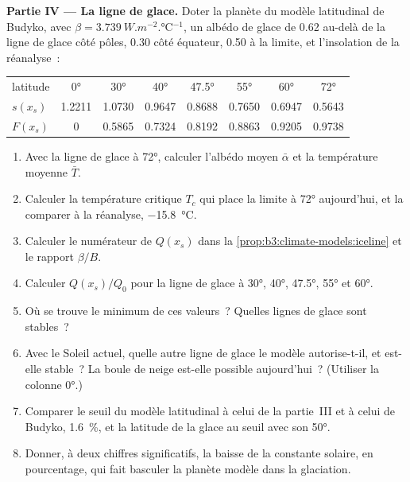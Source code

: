 \begin{problem}
\medskip\noindent\textbf{Partie IV --- La ligne de glace.} Doter la planète
du modèle latitudinal de Budyko, avec $\beta = \qty{3.739}{W.m^{-2}.\celsius^{-1}}$,
un albédo de glace de 0.62 au-delà de la ligne de glace côté pôles, 0.30 côté équateur, 0.50 à
la limite, et l'insolation de la réanalyse~:
\begin{center}
\begin{tabular}{lccccccc}
\hline
latitude & \ang{0} & \ang{30} & \ang{40} & \ang{47.5} & \ang{55} & \ang{60} & \ang{72}\\
$s(x_s)$ & 1.2211 & 1.0730 & 0.9647 & 0.8688 & 0.7650 & 0.6947 & 0.5643\\
$F(x_s)$ & 0 & 0.5865 & 0.7324 & 0.8192 & 0.8863 & 0.9205 & 0.9738\\
\hline
\end{tabular}
\end{center}
\begin{enumerate}[resume]
\item Avec la ligne de glace à \ang{72}, calculer l'albédo moyen $\bar\alpha$
  et la température moyenne $\bar T$.
\item Calculer la température critique $T_c$ qui place la limite à
  \ang{72} aujourd'hui, et la comparer à la réanalyse, \qty{-15.8}{\celsius}.
\item Calculer le numérateur de $Q(x_s)$ dans la \cref{prop:b3:climate-models:iceline}
  et le rapport $\beta/B$.
\item Calculer $Q(x_s)/Q_0$ pour la ligne de glace à \ang{30}, \ang{40},
  \ang{47.5}, \ang{55} et \ang{60}.
\item Où se trouve le minimum de ces valeurs~? Quelles lignes de glace sont stables~?
\item Avec le Soleil actuel, quelle autre ligne de glace le modèle autorise-t-il, et est-elle
  stable~? La boule de neige est-elle possible aujourd'hui~? (Utiliser la colonne \ang{0}.)
\item Comparer le seuil du modèle latitudinal à celui de la partie~III
  et à celui de Budyko, \qty{1.6}{\percent}, et la latitude de la glace au
  seuil avec son \ang{50}.
\item Donner, à deux chiffres significatifs, la baisse de la constante solaire, en
  pourcentage, qui fait basculer la planète modèle dans la glaciation.
\end{enumerate}
\end{problem}
